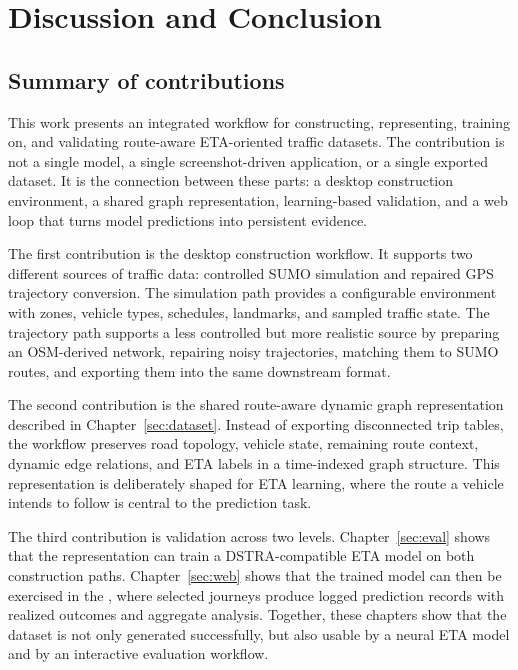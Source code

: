 \chapter{Discussion and Conclusion}\label{sec:discussion}

\section{Summary of contributions}
This work presents an integrated workflow for constructing, representing, training on, and validating route-aware ETA-oriented traffic datasets. The contribution is not a single model, a single screenshot-driven application, or a single exported dataset. It is the connection between these parts: a desktop construction environment, a shared graph representation, learning-based validation, and a web loop that turns model predictions into persistent evidence.

The first contribution is the desktop construction workflow. It supports two different sources of traffic data: controlled SUMO simulation and repaired GPS trajectory conversion. The simulation path provides a configurable environment with zones, vehicle types, schedules, landmarks, and sampled traffic state. The trajectory path supports a less controlled but more realistic source by preparing an OSM-derived network, repairing noisy trajectories, matching them to SUMO routes, and exporting them into the same downstream format.

The second contribution is the shared route-aware dynamic graph representation described in Chapter~\ref{sec:dataset}. Instead of exporting disconnected trip tables, the workflow preserves road topology, vehicle state, remaining route context, dynamic edge relations, and ETA labels in a time-indexed graph structure. This representation is deliberately shaped for ETA learning, where the route a vehicle intends to follow is central to the prediction task.

The third contribution is validation across two levels. Chapter~\ref{sec:eval} shows that the representation can train a DSTRA-compatible ETA model on both construction paths. Chapter~\ref{sec:web} shows that the trained model can then be exercised in the \WebApp{}, where selected journeys produce logged prediction records with realized outcomes and aggregate analysis. Together, these chapters show that the dataset is not only generated successfully, but also usable by a neural ETA model and by an interactive evaluation workflow.

